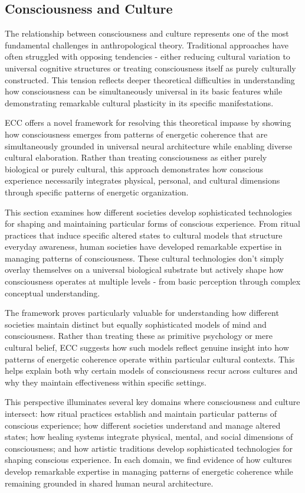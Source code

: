 \begin{refsection}
\section{Consciousness and Culture}

The relationship between consciousness and culture represents one of the most fundamental challenges in anthropological theory. Traditional approaches have often struggled with opposing tendencies - either reducing cultural variation to universal cognitive structures or treating consciousness itself as purely culturally constructed. This tension reflects deeper theoretical difficulties in understanding how consciousness can be simultaneously universal in its basic features while demonstrating remarkable cultural plasticity in its specific manifestations.

ECC offers a novel framework for resolving this theoretical impasse by showing how consciousness emerges from patterns of energetic coherence that are simultaneously grounded in universal neural architecture while enabling diverse cultural elaboration. Rather than treating consciousness as either purely biological or purely cultural, this approach demonstrates how conscious experience necessarily integrates physical, personal, and cultural dimensions through specific patterns of energetic organization.

This section examines how different societies develop sophisticated technologies for shaping and maintaining particular forms of conscious experience. From ritual practices that induce specific altered states to cultural models that structure everyday awareness, human societies have developed remarkable expertise in managing patterns of consciousness. These cultural technologies don't simply overlay themselves on a universal biological substrate but actively shape how consciousness operates at multiple levels - from basic perception through complex conceptual understanding.

The framework proves particularly valuable for understanding how different societies maintain distinct but equally sophisticated models of mind and consciousness. Rather than treating these as primitive psychology or mere cultural belief, ECC suggests how such models reflect genuine insight into how patterns of energetic coherence operate within particular cultural contexts. This helps explain both why certain models of consciousness recur across cultures and why they maintain effectiveness within specific settings.

This perspective illuminates several key domains where consciousness and culture intersect: how ritual practices establish and maintain particular patterns of conscious experience; how different societies understand and manage altered states; how healing systems integrate physical, mental, and social dimensions of consciousness; and how artistic traditions develop sophisticated technologies for shaping conscious experience. In each domain, we find evidence of how cultures develop remarkable expertise in managing patterns of energetic coherence while remaining grounded in shared human neural architecture.


\end{refsection}
